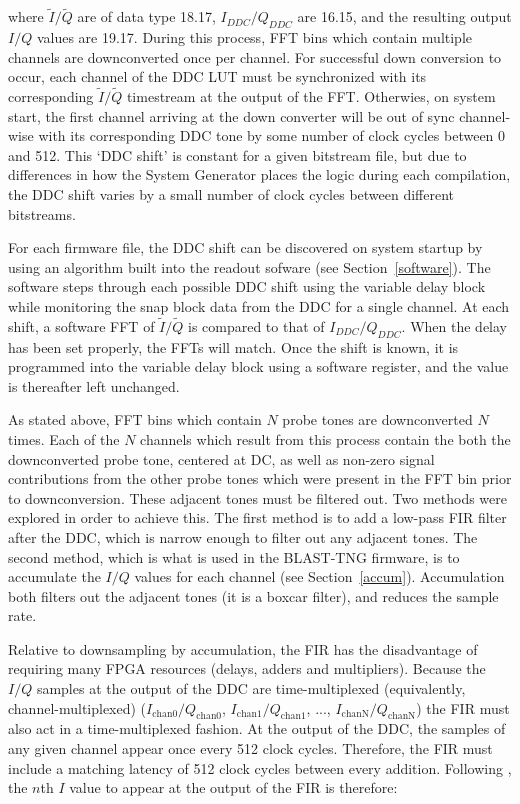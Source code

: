 where $\widetilde{I}/\widetilde{Q}$ are of data type 18.17, $I_{DDC}/Q_{DDC}$ are 16.15, and the resulting output $I/Q$ values are 19.17. During this process, FFT bins which contain multiple channels are downconverted once per channel. For successful down conversion to occur, each channel of the DDC LUT must be synchronized with its corresponding $\widetilde{I}/\widetilde{Q}$ timestream at the output of the FFT. Otherwies, on system start, the first channel arriving at the down converter will be out of sync channel-wise with its corresponding DDC tone by some number of clock cycles between 0 and 512. This `DDC shift' is constant for a given bitstream file, but due to differences in how the System Generator places the logic during each compilation, the DDC shift varies by a small number of clock cycles between different bitstreams.

For each firmware file, the DDC shift can be discovered on system startup by using an algorithm built into the readout sofware (see Section~\ref{software}). The software steps through each possible DDC shift using the variable delay block while monitoring the snap block data from the DDC for a single channel. At each shift, a software FFT of $\widetilde{I}/\widetilde{Q}$ is compared to that of $I_{DDC}/Q_{DDC}$. When the delay has been set properly, the FFTs will match. Once the shift is known, it is programmed into the variable delay block using a software register, and the value is thereafter left unchanged.

As stated above, FFT bins which contain $N$ probe tones are downconverted $N$ times. Each of the $N$ channels which result from this process contain the both the downconverted probe tone, centered at DC, as well as non-zero signal contributions from the other probe tones which were present in the FFT bin prior to downconversion. These adjacent tones must be filtered out. Two methods were explored in order to achieve this. The first method is to add a low-pass FIR filter after the DDC, which is narrow enough to filter out any adjacent tones. The second method, which is what is used in the BLAST-TNG firmware, is to accumulate the $I/Q$ values for each channel (see Section~\ref{accum}). Accumulation both filters out the adjacent tones (it is a boxcar filter), and reduces the sample rate.

Relative to downsampling by accumulation, the FIR has the disadvantage of requiring many FPGA resources (delays, adders and multipliers). Because the $I/Q$ samples at the output of the DDC are time-multiplexed (equivalently, channel-multiplexed) ($I_{\mathrm{chan0}}/Q_{\mathrm{chan0}}$, $I_{\mathrm{chan1}}/Q_{\mathrm{chan1}}$, ..., $I_{\mathrm{chanN}}/Q_{\mathrm{chanN}}$) the FIR must also act in a time-multiplexed fashion. At the output of the DDC, the samples of any given channel appear once every 512 clock cycles. Therefore, the FIR must include a matching latency of 512 clock cycles between every addition. Following \citet{strader2016digitial}, the $n$th $I$ value to appear at the output of the FIR is therefore:

